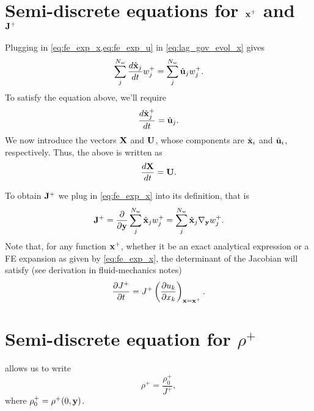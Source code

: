 \documentclass[11pt]{article}
\begin{document}
\section{Semi-discrete equations for $\mathbf{x}^+$ and $\mathbf{J}^+$}
Plugging in \cref{eq:fe_exp_x,eq:fe_exp_u} in \cref{eq:lag_gov_evol_x} gives
\begin{equation}
    \sum_{j}^{N_w} \frac{d \hat{\mathbf{x}}_j}{dt} w^+_j = \sum_{j}^{N_w} \hat{\mathbf{u}}_j w^+_j.
\end{equation}
To satisfy the equation above, we'll require
\begin{equation}
    \frac{d \hat{\mathbf{x}}^+_j}{dt} = \hat{\mathbf{u}}_j.
\end{equation}
We now introduce the vectors $\mathbf{X}$ and $\mathbf{U}$, whose components are $\hat{\mathbf{x}}_i$ and $\hat{\mathbf{u}}_i$, respectively. Thus, the above is written as
\begin{equation}
    \frac{d\mathbf{X}}{dt} = \mathbf{U}.
\end{equation}

To obtain $\mathbf{J}^+$ we plug in \cref{eq:fe_exp_x} into its definition, that is
\begin{equation}
    \mathbf{J}^+ = \frac{\partial}{\partial \mathbf{y}} \sum_j^{N_w} \hat{\mathbf{x}}_j w^+_j = \sum_j^{N_w} \hat{\mathbf{x}}_j \nabla_{\mathbf{y}} w^+_j.
\end{equation}
Note that, for any function $\mathbf{x}^+$, whether it be an exact analytical expression or a FE expansion as given by \cref{eq:fe_exp_x}, the determinant of the Jacobian will satisfy (see derivation in fluid-mechanics notes)
\begin{equation}
    \frac{\partial J^+}{\partial t} = J^+ \left ( \frac{\partial u_k}{\partial x_k} \right )_{\mathbf{x} = \mathbf{x}^+}.
\end{equation}

\section{Semi-discrete equation for $\rho^+$}
 allows us to write
\begin{equation}
    \label{eq:evol_rho_semi_discrete}
    \rho^+ = \frac{\rho^+_0}{J^+},
\end{equation}
where $\rho^+_0 = \rho^+(0,\mathbf{y})$.
\end{document}
